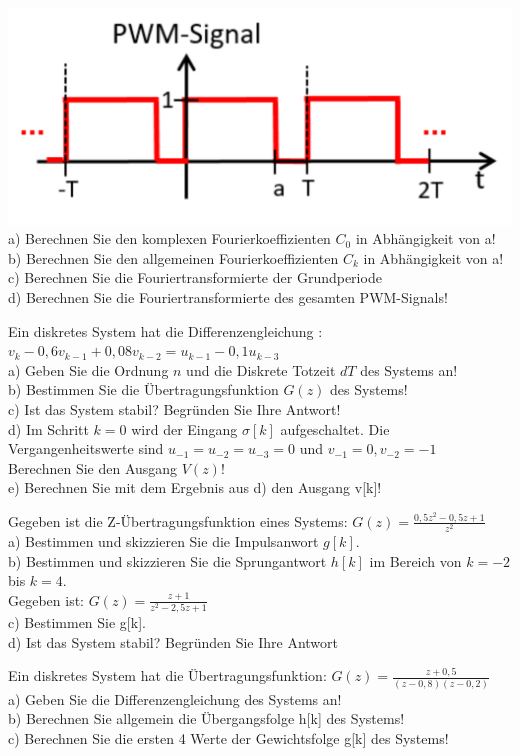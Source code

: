 \documentclass[A4]{scrartcl}
\begin{document}
  \includegraphics{zeitfunktion6.png}\\
  a) Berechnen Sie den komplexen Fourierkoeffizienten $C_0$ in Abhängigkeit von a!\\
  b) Berechnen Sie den allgemeinen Fourierkoeffizienten $C_k$ in Abhängigkeit von a!\\
  c) Berechnen Sie die Fouriertransformierte der Grundperiode\\
  d) Berechnen Sie die Fouriertransformierte des gesamten PWM-Signals!\\
  \newpage


  Ein diskretes System hat die Differenzengleichung : $v_k - 0,6v_{k-1}+0,08v_{k-2}=u_{k-1}-0,1u_{k-3}$\\
  a) Geben Sie die Ordnung $n$ und die Diskrete Totzeit $dT$ des Systems an!\\
  b) Bestimmen Sie die Übertragungsfunktion $G(z)$ des Systems!\\
  c) Ist das System stabil? Begründen Sie Ihre Antwort!\\
  d) Im Schritt $k=0$ wird der Eingang $ \sigma[k]$ aufgeschaltet. Die Vergangenheitswerte sind $u_{-1} = u_{-2} = u_{-3} = 0$ und $v_{-1} = 0, v_{-2} = -1$\\
  Berechnen Sie den Ausgang $V(z)$!\\
  e) Berechnen Sie mit dem Ergebnis aus d) den Ausgang v[k]!\\
  \newpage

  Gegeben ist die Z-Übertragungsfunktion eines Systems: $G(z) = \frac{0,5z^2 - 0,5z+ 1}{z^2}$\\
  a) Bestimmen und skizzieren Sie die Impulsanwort $g[k]$.\\
  b) Bestimmen und skizzieren Sie die Sprungantwort $h[k]$ im Bereich von $k=-2$ bis $k=4$.\\
  Gegeben ist: $G(z) = \frac{z+1}{z^2 -2,5z +1}$\\
  c) Bestimmen Sie g[k].\\
  d) Ist das System stabil? Begründen Sie Ihre Antwort\\
  \newpage

  Ein diskretes System hat die Übertragungsfunktion: $G(z) = \frac{z+0,5}{(z-0,8)(z-0,2)}$\\
  a) Geben Sie die Differenzengleichung des Systems an!\\
  b) Berechnen Sie allgemein die Übergangsfolge h[k] des Systems! \\
  c) Berechnen Sie die ersten 4 Werte der Gewichtsfolge g[k] des Systems! \\
\end{document}
